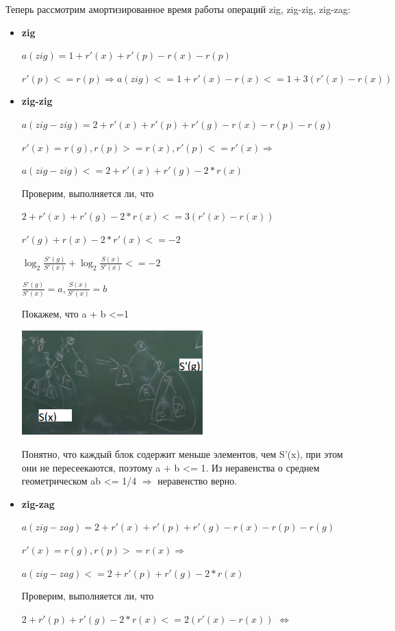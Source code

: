 Теперь рассмотрим амортизированное время работы операций zig, zig-zig, zig-zag:
\begin{itemize}
    \item \textbf{zig}
    
    $a(zig) = 1 + r'(x) + r'(p) - r(x) - r(p)$

$r'(p) <= r(p)    \Longrightarrow     a(zig) <= 1 + r'(x) - r(x) <= 1 + 3(r'(x) - r(x))$

\item \textbf{zig-zig}

$a(zig-zig) = 2 + r'(x) + r'(p)  + r'(g)- r(x) - r(p) - r(g)$

$r'(x) = r(g), r(p) >= r(x), r'(p) <= r'(x)  \Longrightarrow $

$a(zig-zig) <= 2 + r'(x)  + r'(g)- 2*r(x) $

Проверим, выполняется ли, что 

$ 2 + r'(x)  + r'(g)- 2*r(x) <= 3(r'(x) - r(x))$

$ r'(g) + r(x) - 2*r'(x) <= -2$


$ \log_{2}{\frac{S'(g)}{S'(x)}} + \log_{2}{\frac{S(x)}{S'(x)}} <= -2$

$\frac{S'(g)}{S'(x)} = a, \frac{S(x)}{S'(x)} = b $

Покажем, что a + b <=1

\includegraphics[width = 7cm]{images/47-50_zzp}

Понятно, что каждый блок содержит меньше элементов, чем S'(x), при этом они не пересеекаются, поэтому a + b <= 1. Из неравенства о среднем геометрическом ab <= 1/4 $ \Longrightarrow $ неравенство верно.

\item \textbf{zig-zag}

$a(zig-zag) = 2 + r'(x) + r'(p)  + r'(g)- r(x) - r(p) - r(g)$

$r'(x) = r(g), r(p) >= r(x) \Longrightarrow $

$a(zig-zag) <= 2 + r'(p) + r'(g) - 2*r(x)$

Проверим, выполняется ли, что 

$ 2 + r'(p) + r'(g) - 2*r(x) <= 2(r'(x) - r(x))$    $\Leftrightarrow$


\end{itemize}
